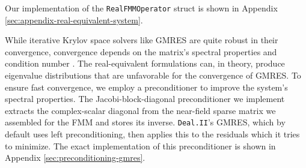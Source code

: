 Our implementation of the \texttt{RealFMMOperator} struct is shown in Appendix \ref{sec:appendix-real-equivalent-system}.

While iterative Krylov space solvers like \ac{GMRES} are quite robust in their convergence, convergence depends on the matrix's spectral properties and condition number \cite{saadgmresgeneralizedminimal1986}. The real-equivalent formulations can, in theory, produce eigenvalue distributions that are unfavorable for the convergence of \ac{GMRES}. To ensure fast convergence, we employ a preconditioner to improve the system's spectral properties. The Jacobi-block-diagonal preconditioner \cite{daysolvingcomplexvaluedlinear2001,benziblockpreconditioningrealvalued2007} we implement extracts the complex-scalar diagonal from the near-field sparse matrix we assembled for the \ac{FMM} and stores its inverse. \texttt{Deal.II}'s \ac{GMRES}, which by default uses left preconditioning, then applies this to the residuals which it tries to minimize. The exact implementation of this preconditioner is shown in Appendix \ref{sec:preconditioning-gmres}.